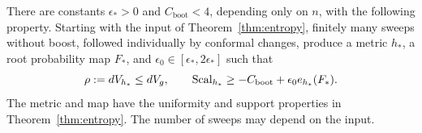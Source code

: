 \begin{lemma}\label{lem:entropy-bootstrap}
There are constants \(\epsilon_*>0\) and \(C_{\mathrm{boot}}<4\),
depending only on \(n\), with the following property.  Starting with
the input of Theorem~\ref{thm:entropy}, finitely many sweeps without
boost, followed individually by conformal changes, produce a metric
\(h_*\), a root probability map \(F_*\), and
\(\epsilon_0\in[\epsilon_*,2\epsilon_*]\) such that
\begin{equation}\label{eq:entropy-bootstrap-output}
 \rho:=dV_{h_*}\leq dV_g,\qquad
 \operatorname{Scal}_{h_*}\geq-C_{\mathrm{boot}}+\epsilon_0e_{h_*}(F_*).
\end{equation}
The metric and map have the uniformity and support properties in
Theorem~\ref{thm:entropy}.  The number of sweeps may depend on the input.
\end{lemma}

